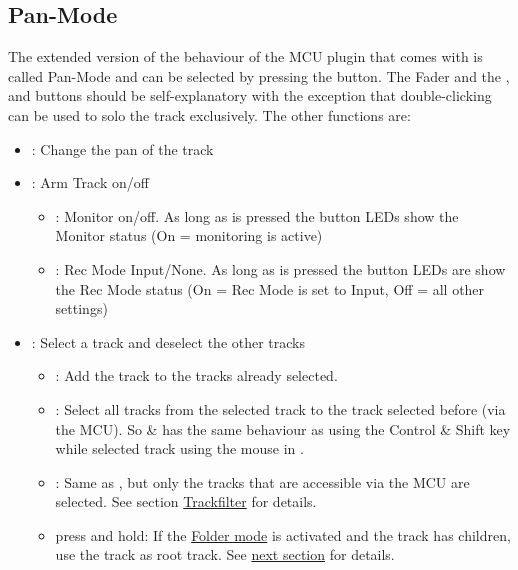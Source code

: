 \newpage

\subsection{Pan-Mode}\label{panmode} 
The extended version of the behaviour of the MCU plugin that comes
with \reaper is called Pan-Mode and can be selected by pressing the \pan
button. The Fader and the \vpots,  \mute and \solo buttons should be
self-explanatory with the exception that double-clicking \solo can be
used to solo the track exclusively. The other functions are:

\begin{itemize}
\item \vpots: Change the pan of the track

\item \rec: Arm Track on/off
        \bemod
        \begin{itemize}
        \item \shift: Monitor on/off. As long as \shift is pressed the
          \rec button LEDs show the Monitor status (On = monitoring
          is active)
        \item \option: Rec Mode Input/None. As long as \option is
          pressed the \solo button LEDs are show the Rec Mode
          status (On = Rec Mode is set to Input, Off = all other
          settings)
        \end{itemize}
        
\item \select: Select a track and deselect the other tracks
        \bemod 
        \begin{itemize}
        \item \control: Add the track to the tracks already selected.
        \item \shift: Select all tracks from the selected track to the
          track selected before (via the MCU). So \control \& \shift
          has the same behaviour as using the Control \& Shift key
          while selected track using the mouse in \reaper.
        \item \alt: Same as \shift, but only the tracks that are
          accessible via the MCU are selected. See section
          \hyperref[trackfilter]{Trackfilter} for details.
        \item press and hold: If the \hyperref[foldermode]{Folder
            mode} is activated and the track has children, use the
          track as root track. See \hyperref[foldermode]{next
            section} for details.
        \end{itemize}


\end{itemize}
